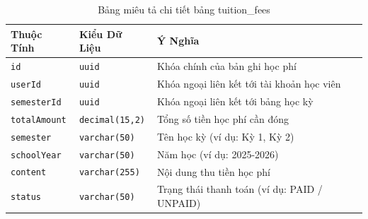 \documentclass[../DoAn.tex]{subfiles}
\begin{document}
\begin{table}[H]
\centering
\small
\renewcommand{\arraystretch}{1.2}
\begin{tabular}{|l|p{4.5cm}|p{7.5cm}|}
\hline
\textbf{Thuộc Tính} & \textbf{Kiểu Dữ Liệu} & \textbf{Ý Nghĩa} \\ \hline
\texttt{id} & \texttt{uuid} & Khóa chính của bản ghi học phí \\ \hline
\texttt{userId} & \texttt{uuid} & Khóa ngoại liên kết tới tài khoản học viên \\ \hline
\texttt{semesterId} & \texttt{uuid} & Khóa ngoại liên kết tới bảng học kỳ \\ \hline
\texttt{totalAmount} & \texttt{decimal(15,2)} & Tổng số tiền học phí cần đóng \\ \hline
\texttt{semester} & \texttt{varchar(50)} & Tên học kỳ (ví dụ: Kỳ 1, Kỳ 2) \\ \hline
\texttt{schoolYear} & \texttt{varchar(50)} & Năm học (ví dụ: 2025-2026) \\ \hline
\texttt{content} & \texttt{varchar(255)} & Nội dung thu tiền học phí \\ \hline
\texttt{status} & \texttt{varchar(50)} & Trạng thái thanh toán (ví dụ: PAID / UNPAID) \\ \hline
\end{tabular}
\caption{Bảng miêu tả chi tiết bảng tuition\_fees}
\label{tab:tuition_fees_details}
\end{table}
\end{document}
